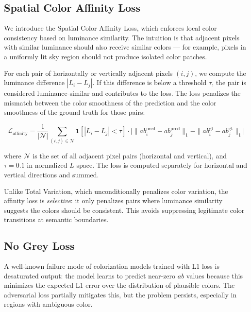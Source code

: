 \documentclass[12pt, a4paper, oneside]{report}
\begin{document}
    \subsection{Spatial Color Affinity Loss}
    \label{sec:affinity}

    We introduce the Spatial Color Affinity Loss, which enforces local color
    consistency based on luminance similarity. The intuition is that adjacent pixels
    with similar luminance should also receive similar colors — for example, pixels
    in a uniformly lit sky region should not produce isolated color patches.

    For each pair of horizontally or vertically adjacent pixels $(i, j)$, we compute
    the luminance difference $|L_i - L_j|$. If this difference is below a threshold
    $\tau$, the pair is considered luminance-similar and contributes to the loss. The
    loss penalizes the mismatch between the color smoothness of the prediction and
    the color smoothness of the ground truth for those pairs:

    \begin{equation}
        \mathcal{L}_{\text{affinity}} = \frac{1}{|\mathcal{N}|}
        \sum_{(i,j) \in \mathcal{N}}
        \mathbf{1}[|L_i - L_j| < \tau] \cdot
        \bigl| \|ab^{\text{pred}}_i - ab^{\text{pred}}_j\|_1
               - \|ab^{\text{gt}}_i - ab^{\text{gt}}_j\|_1 \bigr|
    \end{equation}

    where $\mathcal{N}$ is the set of all adjacent pixel pairs (horizontal and
    vertical), and $\tau = 0.1$ in normalized $L$ space. The loss is computed
    separately for horizontal and vertical directions and summed.

    Unlike Total Variation, which unconditionally penalizes color variation, the
    affinity loss is \textit{selective}: it only penalizes pairs where luminance
    similarity suggests the colors should be consistent. This avoids suppressing
    legitimate color transitions at semantic boundaries.

    \subsection{No Grey Loss}
    \label{sec:nogrey}

    A well-known failure mode of colorization models trained with L1 loss is
    desaturated output: the model learns to predict near-zero $ab$ values because
    this minimizes the expected L1 error over the distribution of plausible colors.
    The adversarial loss partially mitigates this, but the problem persists,
    especially in regions with ambiguous color.
\end{document}
